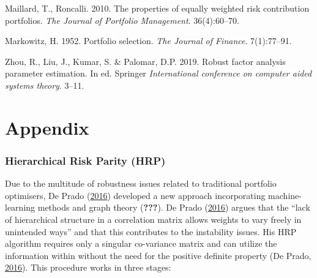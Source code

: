 \documentclass[11pt,preprint, authoryear]{elsarticle}
\numberwithin{equation}{section}
\numberwithin{figure}{section}
\numberwithin{table}{section}
\begin{document}
\leavevmode\hypertarget{ref-maillard2010}{}%
Maillard, T., Roncalli. 2010. The properties of equally weighted risk
contribution portfolios. \emph{The Journal of Portfolio Management}.
36(4):60--70.

\leavevmode\hypertarget{ref-markowitz}{}%
Markowitz, H. 1952. Portfolio selection. \emph{The Journal of Finance}.
7(1):77--91.

\leavevmode\hypertarget{ref-zhou2019}{}%
Zhou, R., Liu, J., Kumar, S. \& Palomar, D.P. 2019. Robust factor
analysis parameter estimation. In ed. Springer \emph{International
conference on computer aided systems theory}. 3--11.

\newpage

\hypertarget{appendix}{%
\section*{Appendix}\label{appendix}}

\hypertarget{hierarchical-risk-parity-hrp}{%
\subsubsection{Hierarchical Risk Parity
(HRP)}\label{hierarchical-risk-parity-hrp}}

Due to the multitude of robustness issues related to traditional
portfolio optimisers, De Prado (\protect\hyperlink{ref-lopez}{2016})
developed a new approach incorporating machine-learning methods and
graph theory ({\textbf{???}}). De Prado
(\protect\hyperlink{ref-lopez}{2016}) argues that the ``lack of
hierarchical structure in a correlation matrix allows weights to vary
freely in unintended ways'' and that this contributes to the instability
issues. His HRP algorithm requires only a singular co-variance matrix
and can utilize the information within without the need for the positive
definite property (De Prado, \protect\hyperlink{ref-lopez}{2016}). This
procedure works in three stages:
\end{document}
